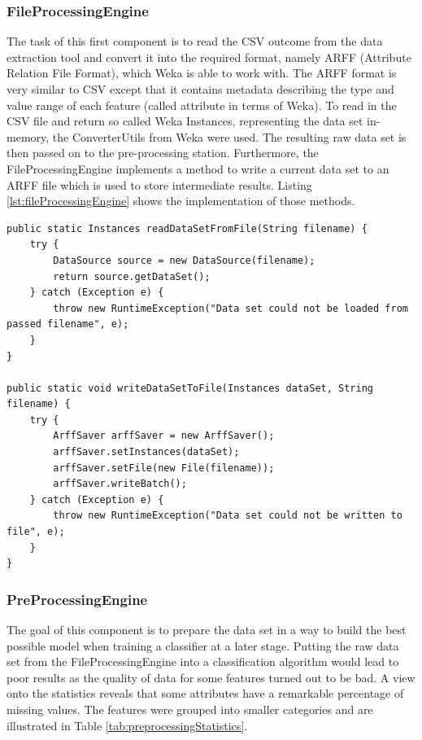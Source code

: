 \subsubsection{FileProcessingEngine}
The task of this first component is to read the CSV outcome from the data extraction tool and convert it into the required format, namely ARFF (Attribute Relation File Format), which Weka is able to work with. The ARFF format is very similar to CSV except that it contains metadata describing the type and value range of each feature (called attribute in terms of Weka). To read in the CSV file and return so called Weka Instances, representing the data set in-memory, the ConverterUtils from Weka were used. The resulting raw data set is then passed on to the pre-processing station. Furthermore, the FileProcessingEngine implements a method to write a current data set to an ARFF file which is used to store intermediate results. Listing \ref{lst:fileProcessingEngine} shows the implementation of those methods. 
\pagebreak
\begin{lstlisting}[caption={Implementation of FileProessingEngine}, label={lst:fileProcessingEngine}]
public static Instances readDataSetFromFile(String filename) {
	try {
		DataSource source = new DataSource(filename);
		return source.getDataSet();
	} catch (Exception e) {
		throw new RuntimeException("Data set could not be loaded from passed filename", e);
	}
}

public static void writeDataSetToFile(Instances dataSet, String filename) {
	try {
		ArffSaver arffSaver = new ArffSaver();
		arffSaver.setInstances(dataSet);
		arffSaver.setFile(new File(filename));
		arffSaver.writeBatch();
	} catch (Exception e) {
		throw new RuntimeException("Data set could not be written to file", e);
	}
}
\end{lstlisting}

\subsubsection{PreProcessingEngine}
The goal of this component is to prepare the data set in a way to build the best possible model when training a classifier at a later stage. Putting the raw data set from the FileProcessingEngine into a classification algorithm would lead to poor results as the quality of data for some features turned out to be bad. A view onto the statistics reveals that some attributes have a remarkable percentage of missing values. The features were grouped into smaller categories and are illustrated in Table \ref{tab:preprocessingStatistics}.

